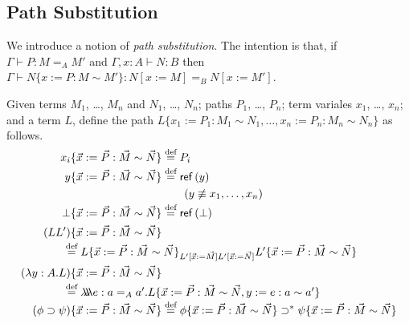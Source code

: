 
\subsection{Path Substitution}

We introduce a notion of \emph{path substitution}.  The intention is that, if
$\Gamma \vdash P : M =_A M'$ and $\Gamma, x : A \vdash N : B$ then $\Gamma \vdash N \{ x := P : M \sim M' \} : N [ x:= M ] =_B N [ x := M' ]$.

\begin{definition}
Given terms $M_1$, \ldots, $M_n$ and $N_1$, \ldots, $N_n$; paths $P_1$, \ldots, $P_n$; term variales $x_1$, \ldots, $x_n$; and a term $L$, define the path $L \{ x_1 := P_1 : M_1 \sim N_1 , \ldots, x_n := P_n : M_n \sim N_n \}$ as follows.
\begin{align*}
x_i \{ \vec{x} := \vec{P} : \vec{M} \sim \vec{N} \} & \eqdef P_i \\
y \{ \vec{x} := \vec{P} : \vec{M} \sim \vec{N} \} & \eqdef \reff{y} \\
& \qquad (y \not\equiv x_1, \ldots, x_n) \\
\bot \{ \vec{x} := \vec{P} : \vec{M} \sim \vec{N} \} & \eqdef \reff{\bot} \\
(LL') \{ \vec{x} := \vec{P} : \vec{M} \sim \vec{N} \} \\
\omit\rlap{\qquad \qquad $\eqdef L \{ \vec{x} := \vec{P} : \vec{M} \sim \vec{N} \}_{L' [\vec{x} := \vec{M}] L' [\vec{x} := \vec{N}]} L' \{ \vec{x} := \vec{P} : \vec{M} \sim \vec{N} \}$} \\
(\lambda y:A.L) \{ \vec{x} := \vec{P} : \vec{M} \sim \vec{N} \} & \\
\omit\rlap{\qquad\qquad $\eqdef \triplelambda e : a =_A a' . L \{ \vec{x} := \vec{P} : \vec{M} \sim \vec{N} , y := e : a \sim a' \}$} \\
(\phi \supset \psi) \{ \vec{x} := \vec{P} : \vec{M} \sim \vec{N} \} & \eqdef \phi \{ \vec{x} := \vec{P} : \vec{M} \sim \vec{N} \} \supset^* \psi \{ \vec{x} := \vec{P} : \vec{M} \sim \vec{N} \}
\end{align*}
\end{definition}

